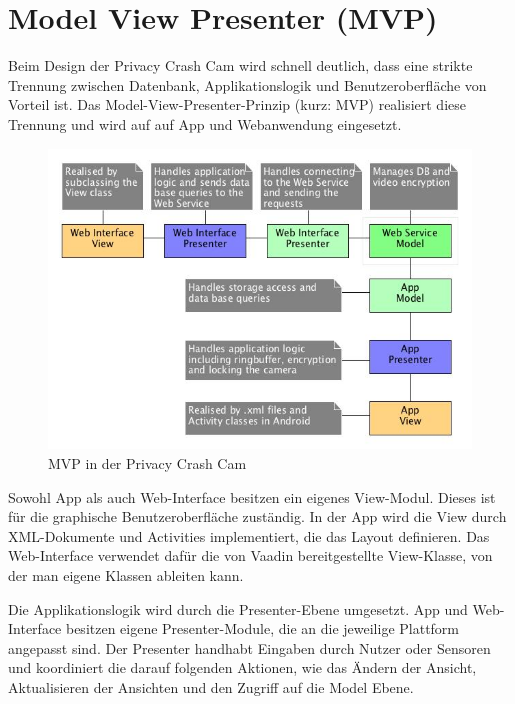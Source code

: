 \section{Model View Presenter (MVP)} \label{allg:MVP}

Beim Design der Privacy Crash Cam wird schnell deutlich, dass eine strikte Trennung zwischen Datenbank, Applikationslogik und Benutzeroberfläche von Vorteil ist. Das Model-View-Presenter-Prinzip (kurz: MVP) realisiert diese Trennung und wird auf auf App und Webanwendung eingesetzt.\newline\par

\begin{figure}[ht]
	\centering
\includegraphics[width=1\textwidth]{./resources/Diagramme/overview_mvp.jpg}
\caption{MVP in der Privacy Crash Cam}
	\label{fig:overview_mvp}
\end{figure}

Sowohl App als auch Web-Interface besitzen ein eigenes View-Modul. Dieses ist für die graphische Benutzeroberfläche zuständig. In der App wird die View durch XML-Dokumente und Activities implementiert, die das Layout definieren. Das Web-Interface verwendet dafür die von Vaadin bereitgestellte View-Klasse, von der man eigene Klassen ableiten kann.\newline\par

Die Applikationslogik wird durch die Presenter-Ebene umgesetzt. App und Web-Interface besitzen eigene Presenter-Module, die an die jeweilige Plattform angepasst sind. Der Presenter handhabt Eingaben durch Nutzer oder Sensoren und koordiniert die darauf folgenden Aktionen, wie das Ändern der Ansicht, Aktualisieren der Ansichten und den Zugriff auf die Model Ebene.\newline\par

